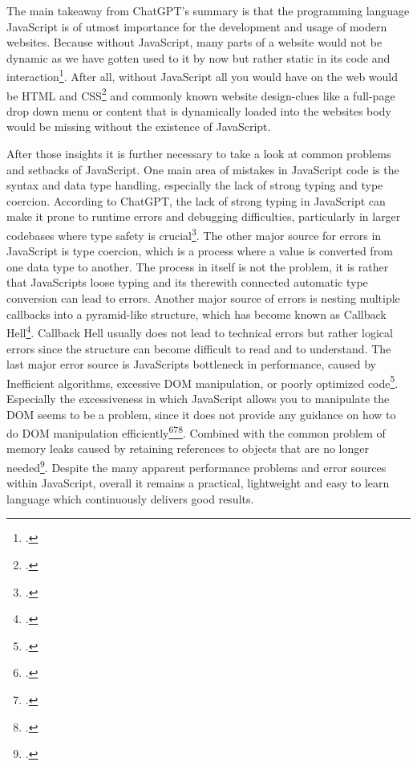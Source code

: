 The main takeaway from ChatGPT's summary is that the programming language JavaScript is of utmost importance for the development and usage of modern websites. Because without JavaScript, many parts of a website would not be dynamic as we have gotten used to it by now but rather static in its code and interaction\footcite[as cited in]{oladele_what_2022}. After all, without JavaScript \dq all you would have on the web would be HTML and CSS\dq\footcite{oladele_what_2022} and commonly known website design-clues like a full-page drop down menu or content that is dynamically loaded into the websites body would be missing without the existence of JavaScript.

After those insights it is further necessary to take a look at common problems and setbacks of JavaScript. One main area of mistakes in JavaScript code is the syntax and data type handling, especially the lack of strong typing and type coercion. According to ChatGPT, the lack of strong typing in JavaScript \dq can make it prone to runtime errors and debugging difficulties, particularly in larger codebases where type safety is crucial\dq\footcite{openai_chatgpt_nodate}. The other major source for errors in JavaScript is type coercion, which is a process where a value is converted from one data type to another. The process in itself is not the problem, it is rather that JavaScripts loose typing and its therewith connected automatic type conversion can lead to errors.
Another major source of errors is nesting multiple callbacks into a pyramid-like structure, which has become known as Callback Hell\footcite{openai_chatgpt_nodate}. Callback Hell usually does not lead to technical errors but rather logical errors since the structure can become difficult to read and to understand. 
The last major error source is JavaScripts bottleneck in performance, caused by \dq Inefficient algorithms, excessive DOM manipulation, or poorly optimized code\dq\footcite{openai_chatgpt_nodate}. Especially the excessiveness in which JavaScript allows you to manipulate the DOM seems to be a problem, since it does not provide any guidance on how to do DOM manipulation efficiently\footcite{openai_chatgpt_nodate}\footcite{peterson_10_nodate}\footcite{mohit_common_nodate}. Combined with the common problem of memory leaks caused by \dq retaining references to objects that are no longer needed\dq\footcite{openai_chatgpt_nodate}.
Despite the many apparent performance problems and error sources within JavaScript, overall it remains a practical, lightweight and easy to learn language which continuously delivers good results.